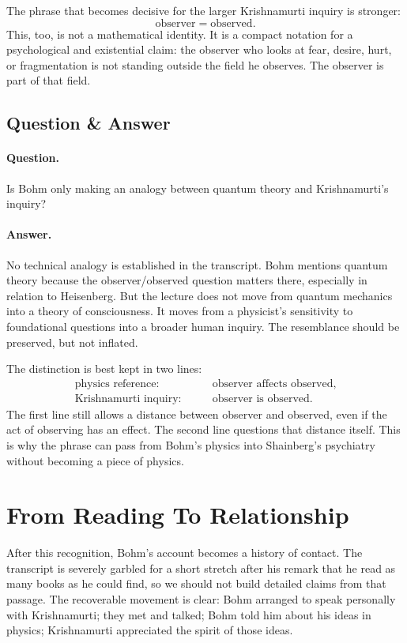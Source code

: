 The phrase that becomes decisive for the larger Krishnamurti inquiry is stronger:
\begin{equation}
\text{observer} = \text{observed}.
\end{equation}
This, too, is not a mathematical identity. It is a compact notation for a psychological and existential claim: the observer who looks at fear, desire, hurt, or fragmentation is not standing outside the field he observes. The observer is part of that field.

\subsection{Question \& Answer}

\paragraph{Question.}
Is Bohm only making an analogy between quantum theory and Krishnamurti's inquiry?

\paragraph{Answer.}
No technical analogy is established in the transcript. Bohm mentions quantum theory because the observer/observed question matters there, especially in relation to Heisenberg. But the lecture does not move from quantum mechanics into a theory of consciousness. It moves from a physicist's sensitivity to foundational questions into a broader human inquiry. The resemblance should be preserved, but not inflated.

The distinction is best kept in two lines:
\begin{align}
\text{physics reference:}\qquad
&\text{observer affects observed},\\
\text{Krishnamurti inquiry:}\qquad
&\text{observer is observed}.
\end{align}
The first line still allows a distance between observer and observed, even if the act of observing has an effect. The second line questions that distance itself. This is why the phrase can pass from Bohm's physics into Shainberg's psychiatry without becoming a piece of physics.

\section{From Reading To Relationship}

After this recognition, Bohm's account becomes a history of contact. The transcript is severely garbled for a short stretch after his remark that he read as many books as he could find, so we should not build detailed claims from that passage. The recoverable movement is clear: Bohm arranged to speak personally with Krishnamurti; they met and talked; Bohm told him about his ideas in physics; Krishnamurti appreciated the spirit of those ideas.

